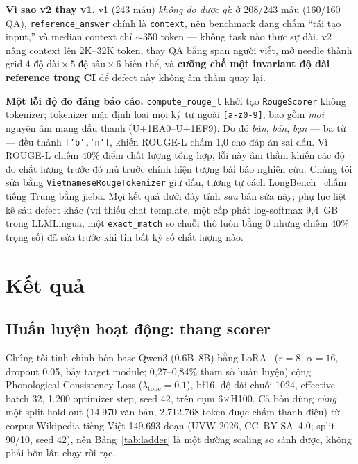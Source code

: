 \documentclass[runningheads]{llncs}
\newcommand{\viet}[1]{\textit{#1}}
\begin{document}
\textbf{Vì sao v2 thay v1.} v1 (243 mẫu) \emph{không đo được gì}: ở 208/243 mẫu (160/160 QA), \texttt{reference\_answer} chính là \texttt{context}, nên benchmark đang chấm ``tái tạo input,'' và median context chỉ $\sim$350 token --- không task nào thực sự dài. v2 nâng context lên 2K--32K token, thay QA bằng span người viết, mở needle thành grid $4\text{ độ dài}\times5\text{ độ sâu}\times6\text{ biến thể}$, và \textbf{cưỡng chế một invariant độ dài reference trong CI} để defect này không âm thầm quay lại.

\textbf{Một lỗi độ đo đáng báo cáo.} \texttt{compute\_rouge\_l} khởi tạo \texttt{RougeScorer} không tokenizer; tokenizer mặc định loại mọi ký tự ngoài \texttt{[a-z0-9]}, bao gồm \emph{mọi} nguyên âm mang dấu thanh (U+1EA0--U+1EF9). Do đó \viet{bàn}, \viet{bán}, \viet{bạn} --- ba từ --- đều thành \texttt{['b','n']}, khiến ROUGE-L chấm 1,0 cho đáp án sai dấu. Vì ROUGE-L chiếm 40\% điểm chất lượng tổng hợp, lỗi này âm thầm khiến các độ đo chất lượng trước đó mù trước chính hiện tượng bài báo nghiên cứu. Chúng tôi sửa bằng \texttt{VietnameseRougeTokenizer} giữ dấu, tương tự cách LongBench~\cite{bai2023longbench} chấm tiếng Trung bằng jieba. Mọi kết quả dưới đây tính \emph{sau} bản sửa này; phụ lục liệt kê sáu defect khác (vd thiếu chat template, một cấp phát log-softmax 9,4~GB trong LLMLingua, một \texttt{exact\_match} so chuỗi thô luôn bằng 0 nhưng chiếm 40\% trọng số) đã sửa trước khi tin bất kỳ số chất lượng nào.


\section{Kết quả}
\label{sec:report}

\subsection{Huấn luyện hoạt động: thang scorer}

Chúng tôi tinh chỉnh bốn base Qwen3 (0.6B--8B) bằng LoRA~\cite{hu2021lora} ($r{=}8$, $\alpha{=}16$, dropout 0,05, bảy target module; 0,27--0,84\% tham số huấn luyện) cộng Phonological Consistency Loss ($\lambda_{\text{tone}}{=}0.1$), bf16, độ dài chuỗi 1024, effective batch 32, 1.200 optimizer step, seed 42, trên cụm 6$\times$H100. Cả bốn dùng \emph{cùng} một split hold-out (14.970 văn bản, 2.712.768 token được chấm thanh điệu) từ corpus Wikipedia tiếng Việt 149.693 đoạn (UVW-2026, CC~BY-SA~4.0; split 90/10, seed 42), nên Bảng~\ref{tab:ladder} là một đường scaling so sánh được, không phải bốn lần chạy rời rạc.
\end{document}
